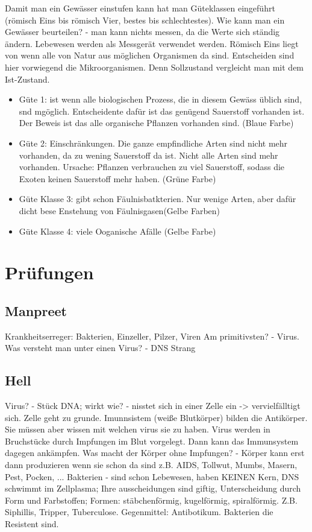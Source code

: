 \documentclass[a4paper]{article}
\begin{document}
Damit man ein Gewässer einstufen kann hat man Güteklassen eingeführt (römisch Eins bis römisch Vier, bestes bis schlechtestes). Wie kann man ein Gewässer beurteilen? - man kann nichts messen, da die Werte sich ständig ändern. Lebewesen werden als Messgerät verwendet werden. Römisch Eins liegt von wenn alle von Natur aus möglichen Organismen da sind. Entscheiden sind hier vorwiegend die Mikroorganismen. Denn Sollzustand vergleicht man mit dem Ist-Zustand.

\begin{itemize}
\item Güte 1: ist wenn alle biologischen Prozess, die in diesem Gewäss üblich sind, snd mgöglich. Entscheidente dafür ist das genügend Sauerstoff vorhanden 
ist. Der Beweis ist das alle organische Pflanzen vorhanden sind. (Blaue Farbe)
\item Güte 2: Einschränkungen. Die ganze empfindliche Arten sind nicht mehr vorhanden, da zu wening Sauerstoff da ist. Nicht alle Arten sind mehr vorhanden. 
Ursache: Pflanzen verbrauchen zu viel Sauerstoff, sodass die Exoten keinen Sauerstoff mehr haben. (Grüne Farbe)
\item Güte Klasse 3: gibt schon  Fäulnisbatkterien. Nur wenige Arten, aber dafür dicht bese Enstehung von Fäulnisgasen(Gelbe Farben)
\item Güte Klasse 4: viele Ooganische Afälle (Gelbe Farbe)
\end{itemize}

\section{Prüfungen}

\subsection{Manpreet}

Krankheitserreger: Bakterien, Einzeller, Pilzer, Viren
Am primitivsten? - Virus. Was versteht man unter einen Virus? - DNS Strang

\subsection{Hell}

Virus? - Stück DNA; wirkt wie? - nisstet sich in einer Zelle ein -> vervielfälltigt sich. Zelle geht zu grunde. Imunnsistem (weiße Blutkörper) bilden die Antikörper. Sie müssen aber wissen mit welchen virus sie zu haben. Virus werden in Bruchstücke durch Impfungen im Blut vorgelegt. Dann kann das Immunsystem dagegen ankämpfen. Was macht der Körper ohne Impfungen? - Körper kann erst dann produzieren wenn sie schon da sind z.B. AIDS, Tollwut, Mumbs, Masern, Pest, Pocken, ... Bakterien - sind schon Lebewesen, haben KEINEN Kern, DNS schwimmt im Zellplasma; Ihre ausscheidungen sind giftig, Unterscheidung durch Form und Farbstoffen; Formen: stäbchenförmig, kugelförmig, spiralförmig. Z.B. Siphillis, Tripper, Tuberculose. Gegenmittel: Antibotikum. Bakterien die Resistent sind.
\end{document}
